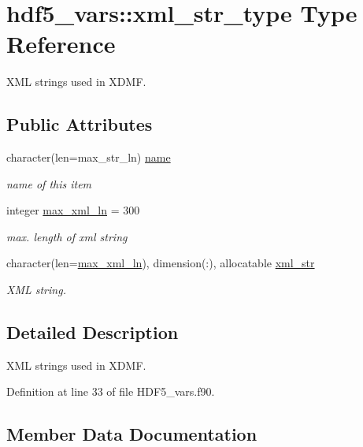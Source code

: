 \hypertarget{structhdf5__vars_1_1xml__str__type}{}\section{hdf5\+\_\+vars\+:\+:xml\+\_\+str\+\_\+type Type Reference}
\label{structhdf5__vars_1_1xml__str__type}


X\+ML strings used in X\+D\+MF.  


\subsection*{Public Attributes}
\begin{DoxyCompactItemize}
\item 
character(len=max\+\_\+str\+\_\+ln) \hyperlink{structhdf5__vars_1_1xml__str__type_abb896e4f55a807dee4d91c139b63f1c2}{name}
\begin{DoxyCompactList}\small\item\em name of this item \end{DoxyCompactList}\item 
integer \hyperlink{structhdf5__vars_1_1xml__str__type_aed78e13b1e4adc34c43797ebcea2c389}{max\+\_\+xml\+\_\+ln} = 300
\begin{DoxyCompactList}\small\item\em max. length of xml string \end{DoxyCompactList}\item 
character(len=\hyperlink{structhdf5__vars_1_1xml__str__type_aed78e13b1e4adc34c43797ebcea2c389}{max\+\_\+xml\+\_\+ln}), dimension(\+:), allocatable \hyperlink{structhdf5__vars_1_1xml__str__type_a2e13e1a8db0b6e15f7213ca3f376b07f}{xml\+\_\+str}
\begin{DoxyCompactList}\small\item\em X\+ML string. \end{DoxyCompactList}\end{DoxyCompactItemize}


\subsection{Detailed Description}
X\+ML strings used in X\+D\+MF. 

Definition at line 33 of file H\+D\+F5\+\_\+vars.\+f90.



\subsection{Member Data Documentation}
\mbox{\label{structhdf5__vars_1_1xml__str__type_aed78e13b1e4adc34c43797ebcea2c389}} 
